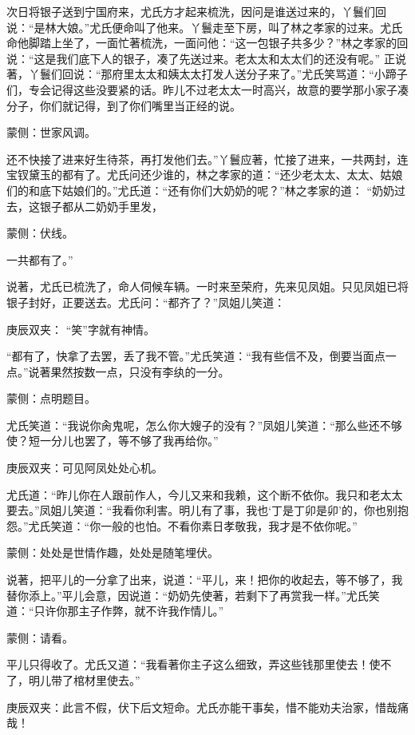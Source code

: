 \begin{parag}
    次日将银子送到宁国府来，尤氏方才起来梳洗，因问是谁送过来的，丫鬟们回说：“是林大娘。”尤氏便命叫了他来。丫鬟走至下房，叫了林之孝家的过来。尤氏命他脚踏上坐了，一面忙著梳洗，一面问他：“这一包银子共多少？”林之孝家的回说：“这是我们底下人的银子，凑了先送过来。老太太和太太们的还没有呢。” 正说著，丫鬟们回说：“那府里太太和姨太太打发人送分子来了。”尤氏笑骂道：“小蹄子们，专会记得这些没要紧的话。昨儿不过老太太一时高兴，故意的要学那小家子凑分子，你们就记得，到了你们嘴里当正经的说。\begin{note}蒙侧：世家风调。\end{note}还不快接了进来好生待茶，再打发他们去。”丫鬟应著，忙接了进来，一共两封，连宝钗黛玉的都有了。尤氏问还少谁的，林之孝家的道：“还少老太太、太太、姑娘们的和底下姑娘们的。”尤氏道：“还有你们大奶奶的呢？”林之孝家的道： “奶奶过去，这银子都从二奶奶手里发，\begin{note}蒙侧：伏线。\end{note}一共都有了。”
\end{parag}


\begin{parag}
    说著，尤氏已梳洗了，命人伺候车辆。一时来至荣府，先来见凤姐。只见凤姐已将银子封好，正要送去。尤氏问：“都齐了？”凤姐儿笑道：\begin{note}庚辰双夹： “笑”字就有神情。\end{note}“都有了，快拿了去罢，丢了我不管。”尤氏笑道：“我有些信不及，倒要当面点一点。”说著果然按数一点，只没有李纨的一分。\begin{note}蒙侧：点明题目。\end{note}尤氏笑道：“我说你肏鬼呢，怎么你大嫂子的没有？”凤姐儿笑道：“那么些还不够使？短一分儿也罢了，等不够了我再给你。”\begin{note}庚辰双夹：可见阿凤处处心机。\end{note}尤氏道：“昨儿你在人跟前作人，今儿又来和我赖，这个断不依你。我只和老太太要去。”凤姐儿笑道：“我看你利害。明儿有了事，我也‘丁是丁卯是卯’的，你也别抱怨。”尤氏笑道：“你一般的也怕。不看你素日孝敬我，我才是不依你呢。”\begin{note}蒙侧：处处是世情作趣，处处是随笔埋伏。\end{note}说著，把平儿的一分拿了出来，说道：“平儿，来！把你的收起去，等不够了，我替你添上。”平儿会意，因说道：“奶奶先使著，若剩下了再赏我一样。”尤氏笑道：“只许你那主子作弊，就不许我作情儿。”\begin{note}蒙侧：请看。\end{note}平儿只得收了。尤氏又道：“我看著你主子这么细致，弄这些钱那里使去！使不了，明儿带了棺材里使去。”\begin{note}庚辰双夹：此言不假，伏下后文短命。尤氏亦能干事矣，惜不能劝夫治家，惜哉痛哉！\end{note}
\end{parag}


